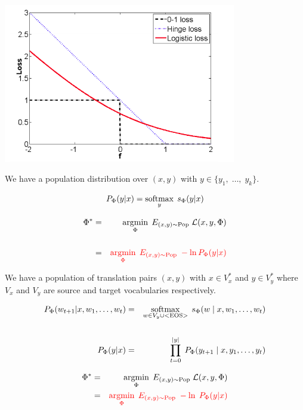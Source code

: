 {

\centerline{\includegraphics[width = 4.0in]{../images/logloss}}


We have a population distribution over $(x,y)$ with $y \in \{y_1,\;\ldots,\;y_k\}$.

\vfill
$$P_\Phi(y|x) = \operatorname*{softmax}_y\;s_\Phi(y|x)$$

\vfill
\begin{eqnarray*}
  \Phi^* & = & \operatorname*{argmin}_\Phi\;E_{(x,y) \sim \mathrm{Pop}}\;{\cal L}(x,y,\Phi) \\
  \\
  & = & {\color{red} \operatorname*{argmin}_\Phi\;E_{(x,y) \sim \mathrm{Pop}}\;- \ln P_\Phi(y|x)}
\end{eqnarray*}


We have a population of translation pairs $(x,y)$ with $x \in V_x^*$ and $y \in V_y^*$ where
$V_x$ and $V_y$ are source and target vocabularies respectively.

\vfill
\begin{eqnarray*}
  P_\Phi(w_{t+1} | x,w_1,\ldots,w_t) & = & \operatorname*{softmax}_{w \in V_y \cup \mathrm{<EOS>}} \; s_\Phi(w\;|\;x,w_1,\ldots,w_t) \\
  \\
  P_\Phi(y|x) & = & \prod_{t = 0}^{|y|} \;P_\Phi(y_{t+1}\;|\;x,y_1,\ldots,y_t)
\end{eqnarray*}

\vfill
\begin{eqnarray*}
  \Phi^* & = & \operatorname*{argmin}_\Phi \;E_{(x,y) \sim \mathrm{Pop}} \;{\cal L}(x,y,\Phi) \\
  & = & {\color{red} \operatorname*{argmin}_\Phi \;E_{(x,y) \sim \mathrm{Pop}} \;-\ln \;P_\Phi(y|x)}
\end{eqnarray*}

}
